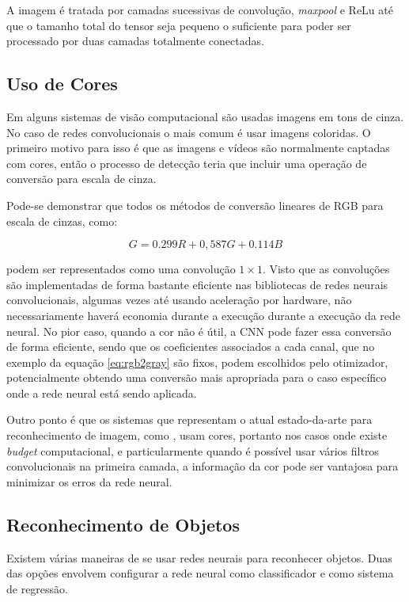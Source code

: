 A imagem é tratada por camadas sucessivas de convolução, \emph{maxpool} e
ReLu até que
o tamanho total do tensor seja pequeno o suficiente para poder ser processado
por duas camadas totalmente conectadas. 

\subsection{Uso de Cores}
Em alguns sistemas de visão computacional são usadas imagens em
tons de cinza. No caso de redes convolucionais o mais comum é usar
imagens coloridas.
O primeiro motivo para isso é que as imagens e vídeos são normalmente
captadas com cores, então o processo de detecção teria que incluir uma operação
de conversão para escala de cinza. 

Pode-se demonstrar que todos os métodos de conversão lineares de RGB para
escala de cinzas, como:

\begin{equation} \label{eq:rgb2gray}
	G=0.299R + 0,587G + 0.114B
\end{equation}

podem ser representados como uma convolução $1 \times 1$. Visto que as
convoluções são implementadas de forma bastante eficiente nas bibliotecas
de redes neurais convolucionais, algumas vezes até usando aceleração por
hardware, não necessariamente haverá economia durante a execução
durante a execução da rede neural. No pior caso, quando a cor não
é útil, a CNN pode fazer
essa conversão de forma eficiente, sendo que os coeficientes associados
a cada canal, que no exemplo da equação \ref{eq:rgb2gray} são fixos, podem
escolhidos pelo otimizador, potencialmente obtendo uma conversão mais
apropriada para o caso específico onde a rede neural está sendo aplicada.

Outro ponto é que os sistemas que representam o atual
estado-da-arte para reconhecimento de imagem, como \cite{szegedy2015going}
\cite{hasanpour2016lets}, usam cores, portanto nos casos onde
existe \emph{budget} computacional, e particularmente quando é possível usar
vários filtros convolucionais na primeira camada, a informação da cor pode
ser vantajosa para minimizar os erros da rede neural.

\subsection{Reconhecimento de Objetos}
Existem várias maneiras de se usar redes neurais para reconhecer objetos. Duas
das opções envolvem configurar a rede neural como classificador e como
sistema de regressão.

